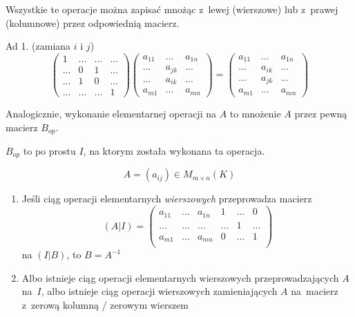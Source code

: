 \begin{uw}
    Wszystkie te operacje można zapisać mnożąc z~lewej (wierszowe) lub
  z~prawej (kolumnowe) przez odpowiednią macierz.

  Ad 1. (zamiana $i$ i $j$)
  \[\begin{pmatrix}
     1 &...&...&...\\
    ...& 0 & 1 &...\\
    ...& 1 & 0 &...\\
    ...&...&...& 1
  \end{pmatrix}\begin{pmatrix}
    a_{11}&...&a_{1n}\\
    ...&a_{jk}&...\\
    ...&a_{ik}&...\\
    a_{m1}&...&a_{mn}
  \end{pmatrix}=\begin{pmatrix}
    a_{11}&...&a_{1n}\\
    ...&a_{ik}&...\\
    ...&a_{jk}&...\\
    a_{m1}&...&a_{mn}
  \end{pmatrix}\]

  Analogicznie, wykonanie elementarnej operacji na $A$ to
  mnożenie $A$ przez pewną macierz $B_{op}$.
  
  $B_{op}$ to po prostu $I$, na ktorym została wykonana ta operacja.
\end{uw}

\begin{ft}
    \[A = (a_{ij}) \in M_{m\times n}(K)\]
  \begin{enumerate}
    \item Jeśli ciąg operacji elementarnych \textit{wierszowych} przeprowadza
      macierz \[(A|I)=\begin{pmatrix}
        a_{11}&...&a_{1n}& 1 &...& 0 \\
        ...&...&...&...& 1 &...\\
        a_{m1}&...&a_{mn}& 0 &...& 1 \\
      \end{pmatrix}\]
      na $(I|B)$, to $B = A^{-1}$
    \item Albo istnieje ciąg operacji elementarnych wierszowych
      przeprowadzających $A$ na~$I$, albo istnieje ciąg operacji
      wierszowych zamieniających $A$ na~macierz z~zerową kolumną /
      zerowym wierszem
  \end{enumerate}
\end{ft}

